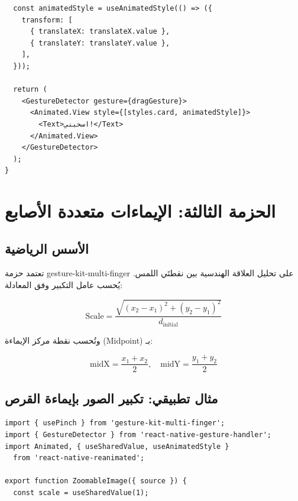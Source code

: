 \begin{Arabic}
\begin{english}
\begin{verbatim}
  const animatedStyle = useAnimatedStyle(() => ({
    transform: [
      { translateX: translateX.value },
      { translateY: translateY.value },
    ],
  }));

  return (
    <GestureDetector gesture={dragGesture}>
      <Animated.View style={[styles.card, animatedStyle]}>
        <Text>اسحبني!</Text>
      </Animated.View>
    </GestureDetector>
  );
}
\end{verbatim}
\end{english}

\section{الحزمة الثالثة: الإيماءات متعددة الأصابع}

\subsection{الأسس الرياضية}

تعتمد حزمة \textenglish{gesture-kit-multi-finger} على تحليل العلاقة الهندسية بين نقطتَي اللمس. يُحسب عامل التكبير وفق المعادلة:

\begin{equation}
\text{Scale} = \frac{\sqrt{(x_2 - x_1)^2 + (y_2 - y_1)^2}}{d_{\text{initial}}}
\end{equation}

وتُحسب نقطة مركز الإيماءة (\textenglish{Midpoint}) بـ:

\begin{equation}
\text{midX} = \frac{x_1 + x_2}{2}, \quad \text{midY} = \frac{y_1 + y_2}{2}
\end{equation}

\subsection{مثال تطبيقي: تكبير الصور بإيماءة القرص}

\begin{english}
\begin{verbatim}
import { usePinch } from 'gesture-kit-multi-finger';
import { GestureDetector } from 'react-native-gesture-handler';
import Animated, { useSharedValue, useAnimatedStyle }
  from 'react-native-reanimated';

export function ZoomableImage({ source }) {
  const scale = useSharedValue(1);


\end{verbatim}
\end{english}
\end{Arabic}
